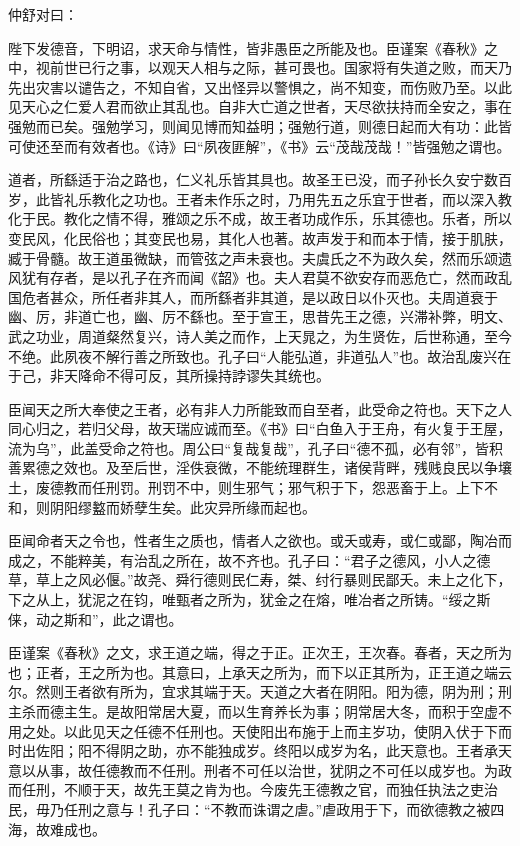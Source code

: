 \documentclass[]{article}
\begin{document}
仲舒对曰：

陛下发德音，下明诏，求天命与情性，皆非愚臣之所能及也。臣谨案《春秋》之中，视前世已行之事，以观天人相与之际，甚可畏也。国家将有失道之败，而天乃先出灾害以谴告之，不知自省，又出怪异以警惧之，尚不知变，而伤败乃至。以此见天心之仁爱人君而欲止其乱也。自非大亡道之世者，天尽欲扶持而全安之，事在强勉而已矣。强勉学习，则闻见博而知益明；强勉行道，则德日起而大有功：此皆可使还至而有效者也。《诗》曰``夙夜匪解''，《书》云``茂哉茂哉！''皆强勉之谓也。

道者，所繇适于治之路也，仁义礼乐皆其具也。故圣王已没，而子孙长久安宁数百岁，此皆礼乐教化之功也。王者未作乐之时，乃用先五之乐宜于世者，而以深入教化于民。教化之情不得，雅颂之乐不成，故王者功成作乐，乐其德也。乐者，所以变民风，化民俗也；其变民也易，其化人也著。故声发于和而本于情，接于肌肤，臧于骨髓。故王道虽微缺，而管弦之声未衰也。夫虞氏之不为政久矣，然而乐颂遗风犹有存者，是以孔子在齐而闻《韶》也。夫人君莫不欲安存而恶危亡，然而政乱国危者甚众，所任者非其人，而所繇者非其道，是以政日以仆灭也。夫周道衰于幽、厉，非道亡也，幽、厉不繇也。至于宣王，思昔先王之德，兴滞补弊，明文、武之功业，周道粲然复兴，诗人美之而作，上天晁之，为生贤佐，后世称通，至今不绝。此夙夜不解行善之所致也。孔子曰``人能弘道，非道弘人''也。故治乱废兴在于己，非天降命不得可反，其所操持誖谬失其统也。

臣闻天之所大奉使之王者，必有非人力所能致而自至者，此受命之符也。天下之人同心归之，若归父母，故天瑞应诚而至。《书》曰``白鱼入于王舟，有火复于王屋，流为乌''，此盖受命之符也。周公曰``复哉复哉''，孔子曰``德不孤，必有邻''，皆积善累德之效也。及至后世，淫佚衰微，不能统理群生，诸侯背畔，残贱良民以争壤土，废德教而任刑罚。刑罚不中，则生邪气；邪气积于下，怨恶畜于上。上下不和，则阴阳缪盭而娇孽生矣。此灾异所缘而起也。

臣闻命者天之令也，性者生之质也，情者人之欲也。或夭或寿，或仁或鄙，陶冶而成之，不能粹美，有治乱之所在，故不齐也。孔子曰：``君子之德风，小人之德草，草上之风必偃。''故尧、舜行德则民仁寿，桀、纣行暴则民鄙夭。未上之化下，下之从上，犹泥之在钧，唯甄者之所为，犹金之在熔，唯冶者之所铸。``绥之斯俫，动之斯和''，此之谓也。

臣谨案《春秋》之文，求王道之端，得之于正。正次王，王次春。春者，天之所为也；正者，王之所为也。其意曰，上承天之所为，而下以正其所为，正王道之端云尔。然则王者欲有所为，宜求其端于天。天道之大者在阴阳。阳为德，阴为刑；刑主杀而德主生。是故阳常居大夏，而以生育养长为事；阴常居大冬，而积于空虚不用之处。以此见天之任德不任刑也。天使阳出布施于上而主岁功，使阴入伏于下而时出佐阳；阳不得阴之助，亦不能独成岁。终阳以成岁为名，此天意也。王者承天意以从事，故任德教而不任刑。刑者不可任以治世，犹阴之不可任以成岁也。为政而任刑，不顺于天，故先王莫之肯为也。今废先王德教之官，而独任执法之吏治民，毋乃任刑之意与！孔子曰：``不教而诛谓之虐。''虐政用于下，而欲德教之被四海，故难成也。
\end{document}
